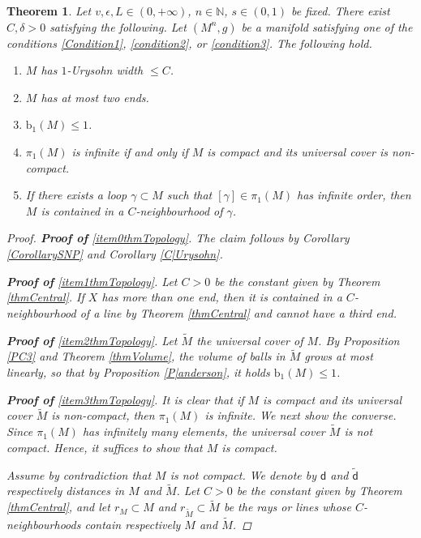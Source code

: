 \documentclass[10pt]{article}
\newtheorem{thm}{Theorem}[section]
\theoremstyle{definition}
\newcommand{\bb}[1]{\mathbb{#1}}
\newcommand{\sd}{\mathsf{d}}
\begin{document}
\begin{thm} \label{thmTopology}
	Let $v,\epsilon,L \in (0,+\infty)$, $n \in \bb{N}$, $s \in (0,1)$ be fixed. There exist $C,\delta>0$ satisfying the following.
    Let $(M^n,g)$ be a manifold satisfying one of the conditions \eqref{Condition1}, \eqref{condition2}, or \eqref{condition3}. The following hold.
    \begin{enumerate}
    \item \label{item0thmTopology} $M$ has $1$-Urysohn width $\leq C$.
    	\item \label{item1thmTopology}$M$ has at most two ends.
    	\item \label{item2thmTopology}$\mathrm{b}_1(M) \leq 1$.
    	\item \label{item3thmTopology}$\pi_1(M)$ is infinite if and only if $M$ is compact and its universal cover is non-compact.
    	\item \label{item4thmTopology}If there exists a loop $\gamma \subset M$ such that $[\gamma] \in \pi_1(M)$ has infinite order, then $M$ is contained in a $C$-neighbourhood of $\gamma$.
    \end{enumerate}
    \begin{proof}
    \textbf{Proof of} \ref{item0thmTopology}. The claim follows by Corollary \ref{CorollarySNP} and Corollary \ref{C|Urysohn}.
    
    \textbf{Proof of} \ref{item1thmTopology}.
    Let $C>0$ be the constant given by Theorem \ref{thmCentral}.
        If $X$ has more than one end, then it is contained in a $C$-neighbourhood of a line by Theorem \ref{thmCentral} and cannot have a third end.
        
        \textbf{Proof of} \ref{item2thmTopology}.
        Let $\tilde{M}$ the universal cover of $M$. 
        By Proposition \ref{PC3} and Theorem \ref{thmVolume}, the volume of balls in $\tilde{M}$ grows at most linearly, so that by Proposition \ref{P|anderson}, it holds $\mathrm{b}_1(M) \leq 1$. 
        
        \textbf{Proof of} \ref{item3thmTopology}.
        It is clear that if $M$ is compact and its universal cover $\tilde{M}$ is non-compact, then $\pi_1(M)$ is infinite.
        We next show the converse.
        Since $\pi_1(M)$ has infinitely many elements, the universal cover $\tilde{M}$ is not compact. Hence, it suffices to show that $M$ is compact.
        
        Assume by contradiction that $M$ is not compact. We denote by $\sd$ and $\tilde{\sd}$ respectively distances in $M$ and $\tilde{M}$. Let $C>0$ be the constant given by Theorem \ref{thmCentral}, and let $r_M \subset M$ and $r_{\tilde{M}} \subset \tilde{M}$ be the rays or lines whose $C$-neighbourhoods contain respectively $M$ and $\tilde{M}$. 
        

\end{proof}
\end{thm}
\end{document}
